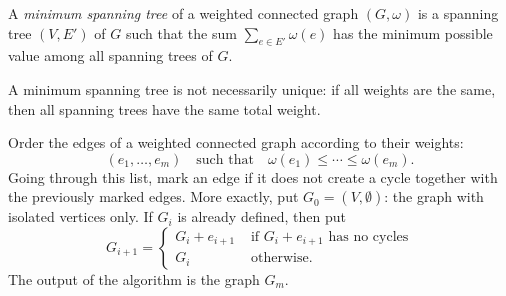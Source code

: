 \begin{page}
\setcounter{section}{2}
\setcounter{subsection}{6}
\setcounter{dfn}{17}
\label{portion:263}

\begin{dfn}
A \emph{minimum spanning tree} of a weighted connected graph $(G, \omega)$ is a spanning tree $(V, E')$ of $G$ such that
the sum $\sum_{e \in E'} \omega(e)$ has the minimum possible value among all spanning trees of $G$.
\end{dfn}

\end{page}

\begin{page}
\setcounter{section}{2}
\setcounter{subsection}{6}
\setcounter{dfn}{17}
\label{portion:264}

A minimum spanning tree is not necessarily unique: if all weights are the same, then all spanning trees have the same total weight.


\end{page}

\begin{page}
\setcounter{section}{2}
\setcounter{subsection}{6}
\setcounter{dfn}{18}
\label{portion:266}

\begin{thm}
Order the edges of a weighted connected graph according to their weights:
\[
(e_1, \ldots, e_m) \quad \text{such that} \quad \omega(e_1) \le \cdots \le \omega(e_m).
\]
Going through this list, mark an edge if it does not create a cycle together with the previously marked edges.
More exactly, put $G_0 = (V, \emptyset)$: the graph with isolated vertices only.
If $G_i$ is already defined, then put
\[
G_{i+1} =
\begin{cases}
G_i + e_{i+1} &\text{ if } G_i + e_{i+1} \text{ has no cycles}\\
G_i &\text{ otherwise.}
\end{cases}
\]
The output of the algorithm is the graph $G_m$.
\end{thm}

\end{page}


